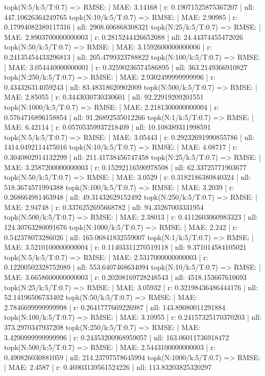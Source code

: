 topk(N:5/k:5/T:0.7) => RMSE: | MAE: 3.14168 | r: 0.19071525875367207 | nll: 447.10626364249765
topk(N:10/k:5/T:0.7) => RMSE: | MAE: 2.90985 | r: 0.17994082389117316 | nll: 2908.606868308321
topk(N:25/k:5/T:0.7) => RMSE: | MAE: 2.8903700000000003 | r: 0.2815244426652088 | nll: 24.44374455472026
topk(N:50/k:5/T:0.7) => RMSE: | MAE: 3.1592600000000006 | r: 0.24135454433296813 | nll: 205.4799323788822
topk(N:100/k:5/T:0.7) => RMSE: | MAE: 3.054440000000001 | r: 0.32590236574586895 | nll: 363.2149366910827
topk(N:250/k:5/T:0.7) => RMSE: | MAE: 2.9302499999999996 | r: 0.434326314059243 | nll: 83.48318620902009
topk(N:500/k:5/T:0.7) => RMSE: | MAE: 2.85055 | r: 0.3443030730330601 | nll: 92.22919209201551
topk(N:1000/k:5/T:0.7) => RMSE: | MAE: 2.2181300000000004 | r: 0.5764716896158854 | nll: 91.26892535012266
topk(N:1/k:5/T:0.7) => RMSE: | MAE: 6.42114 | r: 0.05705359937218409 | nll: 10.108389311998591
topk(N:5/k:5/T:0.7) => RMSE: | MAE: 3.05443 | r: 0.29232691990855786 | nll: 1414.0492114475016
topk(N:10/k:5/T:0.7) => RMSE: | MAE: 4.08717 | r: 0.3040802914132299 | nll: 211.41738456747458
topk(N:25/k:5/T:0.7) => RMSE: | MAE: 3.2587200000000003 | r: 0.15292116590978508 | nll: 62.33725771903677
topk(N:50/k:5/T:0.7) => RMSE: | MAE: 3.0529 | r: 0.3182186380840324 | nll: 518.3674571994388
topk(N:100/k:5/T:0.7) => RMSE: | MAE: 3.2039 | r: 0.268664981463948 | nll: 49.31432629152492
topk(N:250/k:5/T:0.7) => RMSE: | MAE: 2.94748 | r: 0.3376252695668782 | nll: 94.35267003331954
topk(N:500/k:5/T:0.7) => RMSE: | MAE: 2.38013 | r: 0.4112603060983323 | nll: 124.30763280091676
topk(N:1000/k:5/T:0.7) => RMSE: | MAE: 2.242 | r: 0.542378073286026 | nll: 165.06841832559007
topk(N:1/k:5/T:0.7) => RMSE: | MAE: 3.5210100000000004 | r: 0.11403311270519118 | nll: 9.371014584105021
topk(N:5/k:5/T:0.7) => RMSE: | MAE: 2.5317000000000003 | r: 0.12200502328752089 | nll: 553.6407468634094
topk(N:10/k:5/T:0.7) => RMSE: | MAE: 3.6658600000000003 | r: 0.20208169728248543 | nll: 4518.153667610693
topk(N:25/k:5/T:0.7) => RMSE: | MAE: 3.05932 | r: 0.32198436486444176 | nll: 52.14196506733402
topk(N:50/k:5/T:0.7) => RMSE: | MAE: 2.7846699999999998 | r: 0.2641777669226987 | nll: 143.89080011291884
topk(N:100/k:5/T:0.7) => RMSE: | MAE: 3.10955 | r: 0.24157325170370203 | nll: 373.2970347937208
topk(N:250/k:5/T:0.7) => RMSE: | MAE: 3.4290999999999996 | r: 0.24353200968959057 | nll: 163.06011736918472
topk(N:500/k:5/T:0.7) => RMSE: | MAE: 2.5443100000000003 | r: 0.490826030881059 | nll: 214.23797578645994
topk(N:1000/k:5/T:0.7) => RMSE: | MAE: 2.4587 | r: 0.46903139561524226 | nll: 113.83203825320297

